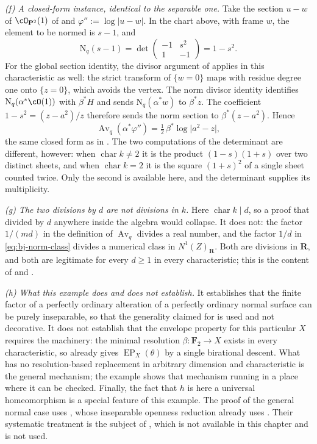 \begin{example}
\emph{(f) A closed-form instance, identical to the separable one.}
Take the section $u-w$ of $\cO_{\mathbf P^2}(1)$ of
 and $\varphi'':=\log|u-w|$.  In the
chart above, with frame $w$, the element to be normed is $s-1$, and
\[
 \mathrm N_q(s-1)
 =\det\begin{pmatrix}-1& s^2\\ 1& -1\end{pmatrix}
 =1-s^2 .
\]
For the global section identity, the divisor argument of
 applies in this characteristic as well:
the strict transform of $\{w=0\}$ maps with residue degree one onto
$\{z=0\}$, which avoids the vertex.  The norm divisor identity
identifies $\mathrm N_q(\alpha^*\cO(1))$ with $\beta^*H$ and sends
$\mathrm N_q(\alpha^*w)$ to $\beta^*z$.
The coefficient $1-s^2=(z-a^2)/z$ therefore sends the norm section
to $\beta^*(z-a^2)$.  Hence
\[
 \operatorname{Av}_q(\alpha^*\varphi'')=\tfrac12\,\beta^*\log\bigl|a^2-z\bigr| ,
\]
the same closed form as in .  The two
computations of the determinant are different, however: when
$\operatorname{char}k\ne2$ it is the product $(1-s)(1+s)$ over two
distinct sheets, and when $\operatorname{char}k=2$ it is the square
$(1+s)^2$ of a single sheet counted twice.  Only the second is available
here, and the determinant supplies its multiplicity.

\emph{(g) The two divisions by $d$ are not divisions in $k$.}
Here $\operatorname{char}k\mid d$, so a proof that divided by $d$
anywhere inside the algebra would collapse.  It does not: the factor
$1/(md)$ in the definition of $\operatorname{Av}_q$ divides a real
number, and the factor $1/d$ in
\eqref{eq:bj-norm-class} divides a numerical class in
$N^1(Z)_{\mathbf R}$.  Both are divisions in $\mathbf R$, and both are
legitimate for every $d\ge1$ in every characteristic; this is the content
of  and .

\emph{(h) What this example does and does not establish.}
It establishes that the finite factor of a perfectly ordinary alteration of
a perfectly ordinary normal surface can be purely inseparable, so that the
generality claimed for  is used and not
decorative.  It does not establish that the envelope property for this
particular $X$ requires the machinery: the minimal resolution
$\beta:\mathbf F_2\to X$ exists in every characteristic, so
 already gives
$\operatorname{EP}_X(\theta)$ by a single birational descent.  What has no
resolution-based replacement in arbitrary dimension and characteristic is
the general mechanism; the example shows that mechanism running in a place
where it can be checked.  Finally, the fact that $h$ is here a universal
homeomorphism is a special feature of this example.  The proof of the general
normal case uses , whose inseparable
openness reduction already uses .  Their systematic treatment is the subject
of , which is not available in this
chapter and is not used.
\end{example}

